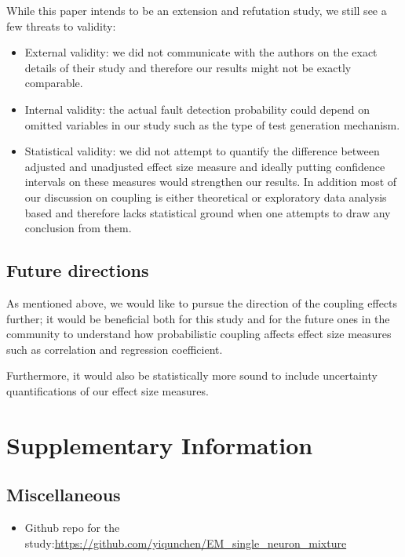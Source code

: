\documentclass[10pt,letterpaper]{article}
\begin{document}
While this paper intends to be an extension and refutation study, we still see a few threats to validity: 
\begin{itemize}
\item
External validity: we did not communicate with the authors on the exact details of their study and therefore our results might not be exactly comparable.

\item

Internal validity: the actual fault detection probability could depend on omitted variables in our study such as the type of test generation mechanism.

\item

Statistical validity: we did not attempt to quantify the difference between adjusted and unadjusted effect size measure and ideally putting confidence intervals on these measures would strengthen our results. In addition most of our discussion on coupling is either theoretical or exploratory data analysis based and therefore lacks statistical ground when one attempts to draw any conclusion from them. 
\end{itemize}

\subsection{Future directions}

As mentioned above, we would like to pursue the direction of the coupling effects further; it would be beneficial both for this study and for the future ones in the community to understand how probabilistic coupling affects effect size measures such as correlation and regression coefficient.

Furthermore, it would also be statistically more sound to include uncertainty quantifications of our effect size measures.


\section*{Supplementary Information}


\subsection*{Miscellaneous}

\begin{itemize}
\item 
Github repo for the study:\url{https://github.com/yiqunchen/EM_single_neuron_mixture}
\end{itemize}
\end{document}
